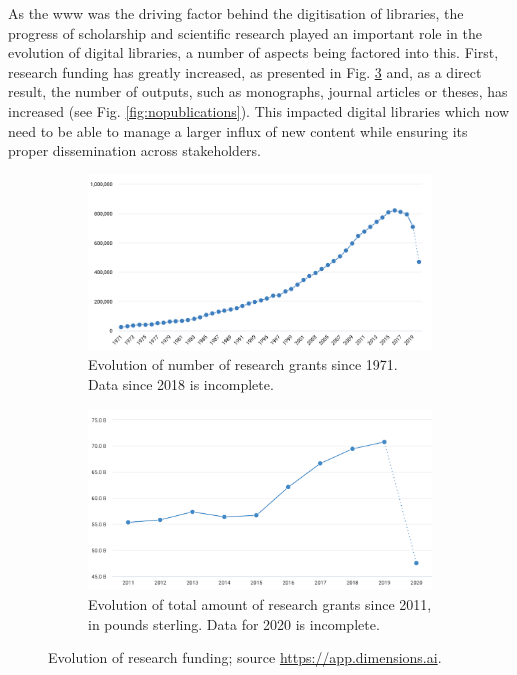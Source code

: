 As the \gls{www} was the driving factor behind the digitisation of libraries, the progress of scholarship and scientific research played an important role in the evolution of digital libraries, a number of aspects being factored into this. First, research funding has greatly increased, as presented in Fig. \ref{fig:fundig} and, as a direct result, the number of outputs, such as monographs, journal articles or theses, has increased (see Fig. \ref{fig:nopublications}). This impacted digital libraries which now need to be able to manage a larger influx of new content while ensuring its proper dissemination across stakeholders. 
\begin{figure}[ht!]
\centering
\begin{subfigure}{0.9\textwidth}
  \includegraphics[width=1\linewidth]{figures/no_grants.png}  
  \caption{Evolution of number of research grants since 1971. Data since 2018 is incomplete.}
  \label{subfig:grants}
\end{subfigure}
\begin{subfigure}{0.9\textwidth}
  \includegraphics[width=1\linewidth]{figures/funding.png}  
  \caption{Evolution of total amount of research grants since 2011, in pounds sterling. Data for 2020 is incomplete.}
  \label{subfig:grantstotal}
\end{subfigure}
\caption{Evolution of research funding; source \url{https://app.dimensions.ai}.}
\label{fig:fundig}
\end{figure}

